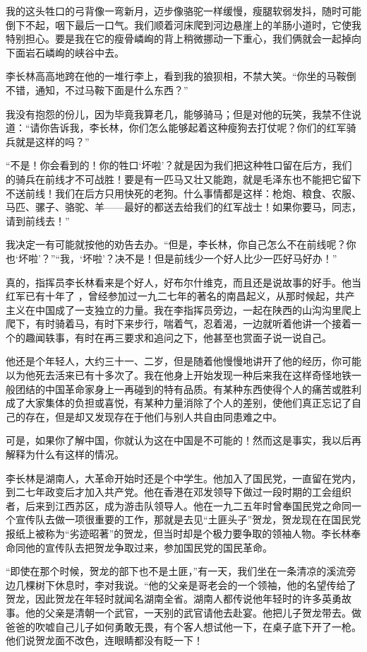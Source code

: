 \documentclass[10pt]{book}
\begin{document}
我的这头牲口的弓背像一弯新月，迈步像骆驼一样缓慢，瘦腿软弱发抖，随时可能倒下不起，咽下最后一口气。我们顺着河床爬到河边悬崖上的羊肠小道时，它使我特别担心。要是我在它的瘦骨嶙峋的背上稍微挪动一下重心，我们俩就会一起掉向下面岩石嶙峋的峡谷中去。

李长林高高地跨在他的一堆行李上，看到我的狼狈相，不禁大笑。“你坐的马鞍倒不错，通知，不过马鞍下面是什么东西？”

我没有抱怨的份儿，因为毕竟我算老几，能够骑马；但是对他的玩笑，我禁不住说道：“请你告诉我，李长林，你们怎么能够起着这种瘦狗去打仗呢？你们的红军骑兵就是这样的吗？”

“不是！你会看到的！你的牲口‘坏啦’？就是因为我们把这种牲口留在后方，我们的骑兵在前线才不可战胜！要是有一匹马又壮又能跑，就是毛泽东也不能把它留下不送前线！我们在后方只用快死的老狗。什么事情都是这样：枪炮、粮食、农服、马匹、骡子、骆驼、羊——最好的都送去给我们的红军战士！如果你要马，同志，请到前线去！”

我决定一有可能就按他的劝告去办。“但是，李长林，你自己怎么不在前线呢？你也‘坏啦’？”“我，‘坏啦’？决不是！但是前线少一个好人比少一匹好马好办！”

真的，指挥员李长林看来是个好人，好布尔什维克，而且还是说故事的好手。他当红军已有十年了 ，曾经参加过一九二七年的著名的南昌起义，从那时候起，共产主义在中国成了一支独立的力量。我在李指挥员旁边，一起在陕西的山沟沟里爬上爬下，有时骑着马，有时下来步行，喘着气，忍着渴，一边就听着他讲一个接着一个的趣闻轶事，有时在再三要求和追问之下，他甚至也赏面子说一说自己。

他还是个年轻人，大约三十一、二岁，但是随着他慢慢地讲开了他的经历，你可能以为他死去活来已有十多次了。我在他身上开始发现一种后来我在这样奇怪地铁一般团结的中国革命家身上一再碰到的特有品质。有某种东西使得个人的痛苦或胜利成了大家集体的负担或喜悦，有某种力量消除了个人的差别，使他们真正忘记了自己的存在，但是却又发现存在于他们与别人共自由同患难之中。

可是，如果你了解中国，你就认为这在中国是不可能的！然而这是事实，我以后再解释为什么有这样的情况。

李长林是湖南人，大革命开始时还是个中学生。他加入了国民党，一直留在党内，到二七年政变后才加入共产党。他在香港在邓发领导下做过一段时期的工会组织者，后来到江西苏区，成为游击队领导人。他在一九二五年时曾奉国民党之命同一个宣传队去做一项很重要的工作，那就是去见“土匪头子”贺龙，贺龙现在在国民党报纸上被称为“劣迹昭著”的贺龙，但当时却是个极力要争取的领袖人物。李长林奉命同他的宣传队去把贺龙争取过来，参加国民党的国民革命。

“即使在那个时候，贺龙的部下也不是土匪，”有一天，我们坐在一条清凉的溪流旁边几棵树下休息时，李对我说。“他的父亲是哥老会的一个领袖，他的名望传给了贺龙，因此贺龙在年轻时就闻名湖南全省。湖南人都传说他年轻时的许多英勇故事。他的父亲是清朝一个武官，一天别的武官请他去赴宴。他把儿子贺龙带去。做爸爸的吹嘘自己儿子如何勇敢无畏，有个客人想试他一下，在桌子底下开了一枪。他们说贺龙面不改色，连眼睛都没有眨一下！
\end{document}
